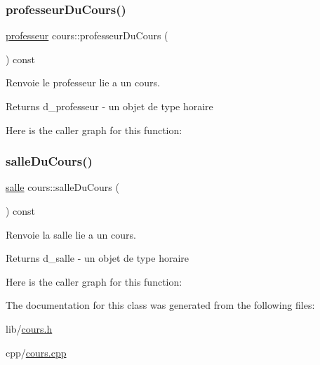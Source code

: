 \subsubsection{\texorpdfstring{professeur\+Du\+Cours()}{professeurDuCours()}}
{\footnotesize\ttfamily \hyperlink{classprofesseur}{professeur} cours\+::professeur\+Du\+Cours (\begin{DoxyParamCaption}{ }\end{DoxyParamCaption}) const}



Renvoie le professeur lie a un cours. 

\begin{DoxyReturn}{Returns}
d\+\_\+professeur -\/ un objet de type horaire 
\end{DoxyReturn}
Here is the caller graph for this function\+:
\hypertarget{classcours_af98361045fec0b63de23c45d3853fb57}{}\label{classcours_af98361045fec0b63de23c45d3853fb57} 
\subsubsection{\texorpdfstring{salle\+Du\+Cours()}{salleDuCours()}}
{\footnotesize\ttfamily \hyperlink{classsalle}{salle} cours\+::salle\+Du\+Cours (\begin{DoxyParamCaption}{ }\end{DoxyParamCaption}) const}



Renvoie la salle lie a un cours. 

\begin{DoxyReturn}{Returns}
d\+\_\+salle -\/ un objet de type horaire 
\end{DoxyReturn}
Here is the caller graph for this function\+:


The documentation for this class was generated from the following files\+:\begin{DoxyCompactItemize}
\item 
lib/\hyperlink{cours_8h}{cours.\+h}\item 
cpp/\hyperlink{cours_8cpp}{cours.\+cpp}\end{DoxyCompactItemize}
